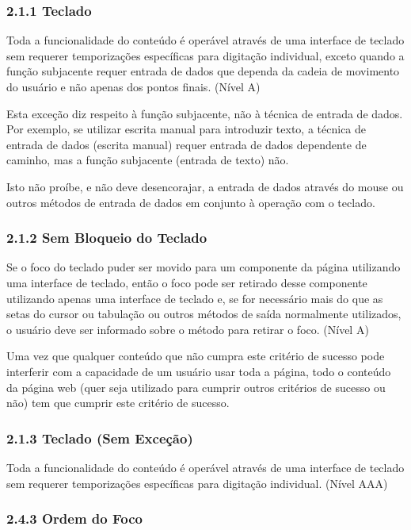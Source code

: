 \documentclass[a4paper]{article}
\begin{document}
\begin{titlepage}
\subsubsection{2.1.1 Teclado}

Toda a funcionalidade do conteúdo é operável através de uma interface de teclado sem requerer temporizações específicas para digitação individual, exceto quando a função subjacente requer entrada de dados que dependa da cadeia de movimento do usuário e não apenas dos pontos finais. (Nível A)

Esta exceção diz respeito à função subjacente, não à técnica de entrada de dados. Por exemplo, se utilizar escrita manual para introduzir texto, a técnica de entrada de dados (escrita manual) requer entrada de dados dependente de caminho, mas a função subjacente (entrada de texto) não.

Isto não proíbe, e não deve desencorajar, a entrada de dados através do mouse ou outros métodos de entrada de dados em conjunto à operação com o teclado.

\subsubsection{2.1.2 Sem Bloqueio do Teclado}

Se o foco do teclado puder ser movido para um componente da página utilizando uma interface de teclado, então o foco pode ser retirado desse componente utilizando apenas uma interface de teclado e, se for necessário mais do que as setas do cursor ou tabulação ou outros métodos de saída normalmente utilizados, o usuário deve ser informado sobre o método para retirar o foco. (Nível A)

Uma vez que qualquer conteúdo que não cumpra este critério de sucesso pode interferir com a capacidade de um usuário usar toda a página, todo o conteúdo da página web (quer seja utilizado para cumprir outros critérios de sucesso ou não) tem que cumprir este critério de sucesso.

\subsubsection{2.1.3 Teclado (Sem Exceção)}

Toda a funcionalidade do conteúdo é operável através de uma interface de teclado sem requerer temporizações específicas para digitação individual. (Nível AAA)

\subsubsection{2.4.3 Ordem do Foco}


\end{titlepage}
\end{document}
